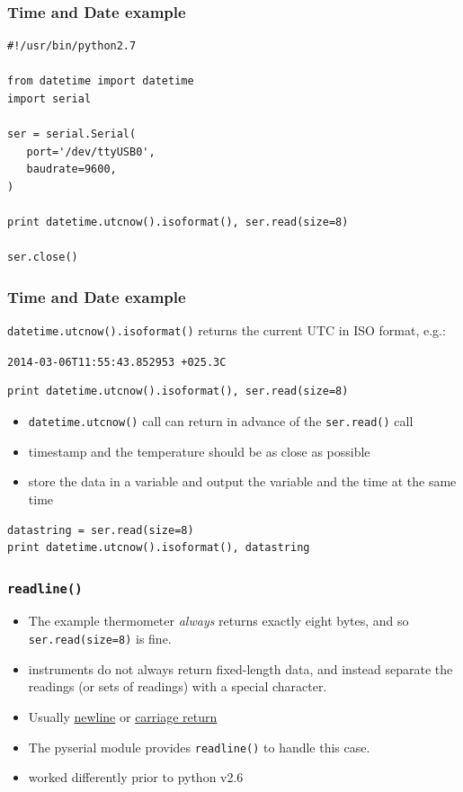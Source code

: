 \documentclass[aspectratio=1610,9pt]{beamer} %
\begin{document}
\begin{frame}[fragile]
\frametitle{Time and Date example}

\begin{verbatim}
#!/usr/bin/python2.7

from datetime import datetime
import serial

ser = serial.Serial(
   port='/dev/ttyUSB0',
   baudrate=9600,
)

print datetime.utcnow().isoformat(), ser.read(size=8) 

ser.close()
\end{verbatim}
\end{frame}
\begin{frame}[fragile]
\frametitle{Time and Date example}

\texttt{datetime.utcnow().isoformat()} returns the current UTC in ISO format, e.g.:

\texttt{2014-03-06T11:55:43.852953 +025.3C}

\begin{verbatim}
print datetime.utcnow().isoformat(), ser.read(size=8) 
\end{verbatim}

\begin{itemize}
\itemsep1pt\parskip0pt
\item
  \texttt{datetime.utcnow()} call can return in advance of the
  \texttt{ser.read()} call
\item
  timestamp and the temperature should be as close as possible
\item
  store the data in a variable and output the variable and the time at
  the same time
\end{itemize}

\begin{verbatim}
datastring = ser.read(size=8)
print datetime.utcnow().isoformat(), datastring
\end{verbatim}

\end{frame}
\begin{frame}[fragile]
\frametitle{\texttt{readline()}}

\begin{itemize}
\item
  The example thermometer \emph{always} returns exactly eight bytes, and
  so \texttt{ser.read(size=8)} is fine.
\item
  instruments do not always return fixed-length data, and instead
  separate the readings (or sets of readings) with a special character.
\item
  Usually \href{http://en.wikipedia.org/wiki/Newline}{newline} or
  \href{http://en.wikipedia.org/wiki/Carriage_return}{carriage return}
\item
  The pyserial module provides \texttt{readline()} to handle this case.
\end{itemize}

\begin{itemize}
\itemsep1pt\parskip0pt
\item
  worked differently prior to python v2.6
\end{itemize}

\end{frame}
\end{document}
